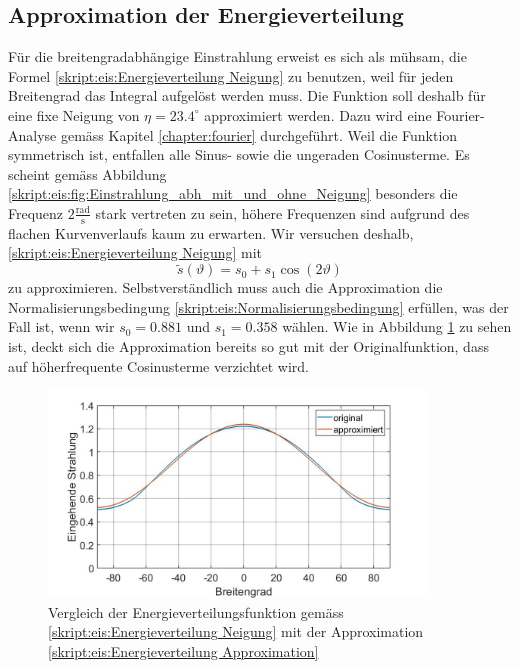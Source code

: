 \begin{refsection}
\subsection{Approximation der Energieverteilung}
Für die breitengradabhängige Einstrahlung erweist es sich als mühsam, die Formel \eqref{skript:eis:Energieverteilung Neigung} zu benutzen, weil für jeden Breitengrad das Integral aufgelöst werden muss. Die Funktion soll deshalb für eine fixe Neigung von $\eta=23.4^{\circ}$ approximiert werden. Dazu wird eine Fourier-Analyse gemäss Kapitel \ref{chapter:fourier} durchgeführt. Weil die Funktion symmetrisch ist, entfallen alle Sinus- sowie die ungeraden Cosinusterme. Es scheint gemäss Abbildung \ref{skript:eis:fig:Einstrahlung_abh_mit_und_ohne_Neigung} besonders die Frequenz $2\tfrac{\text{rad}}{\text{s}}$ stark vertreten zu sein, höhere Frequenzen sind aufgrund des flachen Kurvenverlaufs kaum zu erwarten. Wir versuchen deshalb, \eqref{skript:eis:Energieverteilung Neigung} mit
\begin{equation}\label{skript:eis:Energieverteilung Approximation}
	\tilde{s}(\vartheta)
	=
	s_0+s_1\cos(2\vartheta)
\end{equation}
zu approximieren.
Selbstverständlich muss auch die Approximation die Normalisierungsbedingung \eqref{skript:eis:Normalisierungsbedingung} erfüllen, was der Fall ist, wenn wir $s_0=0.881$ und $s_1=0.358$ wählen.
Wie in Abbildung \ref{skript:eis:fig:Einstrahlung_approximiert_Vergleich} zu sehen ist, deckt sich die Approximation bereits so gut mit der Originalfunktion, dass auf höherfrequente Cosinusterme verzichtet wird.
\begin{figure}
	\centering
	\includegraphics[width=10cm]{eis/Einstrahlung_approximiert_Vergleich.jpg}
	\caption{Vergleich der Energieverteilungsfunktion gemäss \eqref{skript:eis:Energieverteilung Neigung} mit der Approximation \eqref{skript:eis:Energieverteilung Approximation}}
	\label{skript:eis:fig:Einstrahlung_approximiert_Vergleich}
\end{figure}

\end{refsection}
